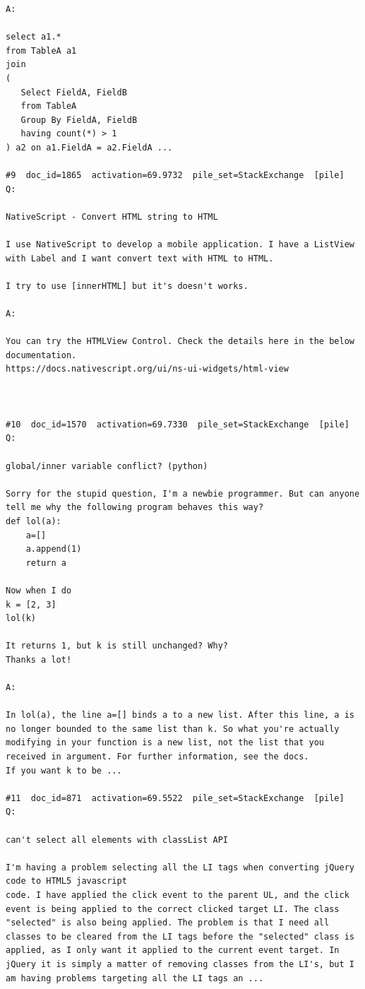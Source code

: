 \begin{verbatim}
A:

select a1.* 
from TableA a1
join
(
   Select FieldA, FieldB
   from TableA 
   Group By FieldA, FieldB 
   having count(*) > 1
) a2 on a1.FieldA = a2.FieldA ...

#9  doc_id=1865  activation=69.9732  pile_set=StackExchange  [pile]
Q:

NativeScript - Convert HTML string to HTML

I use NativeScript to develop a mobile application. I have a ListView with Label and I want convert text with HTML to HTML.

I try to use [innerHTML] but it's doesn't works.

A:

You can try the HTMLView Control. Check the details here in the below documentation.
https://docs.nativescript.org/ui/ns-ui-widgets/html-view



#10  doc_id=1570  activation=69.7330  pile_set=StackExchange  [pile]
Q:

global/inner variable conflict? (python)

Sorry for the stupid question, I'm a newbie programmer. But can anyone tell me why the following program behaves this way?
def lol(a):
    a=[]
    a.append(1)
    return a

Now when I do 
k = [2, 3]
lol(k)

It returns 1, but k is still unchanged? Why?
Thanks a lot!

A:

In lol(a), the line a=[] binds a to a new list. After this line, a is no longer bounded to the same list than k. So what you're actually modifying in your function is a new list, not the list that you received in argument. For further information, see the docs.
If you want k to be ...

#11  doc_id=871  activation=69.5522  pile_set=StackExchange  [pile]
Q:

can't select all elements with classList API

I'm having a problem selecting all the LI tags when converting jQuery code to HTML5 javascript
code. I have applied the click event to the parent UL, and the click event is being applied to the correct clicked target LI. The class "selected" is also being applied. The problem is that I need all classes to be cleared from the LI tags before the "selected" class is applied, as I only want it applied to the current event target. In jQuery it is simply a matter of removing classes from the LI's, but I am having problems targeting all the LI tags an ...


\end{verbatim}
